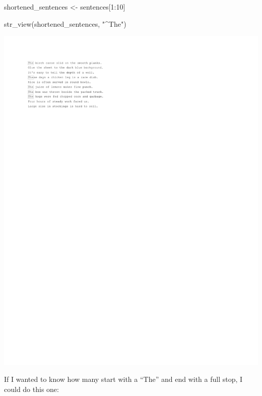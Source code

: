 \documentclass[
]{book}
\newenvironment{Shaded}{\begin{snugshade}}{\end{snugshade}}
\newcommand{\DecValTok}[1]{\textcolor[rgb]{0.00,0.00,0.81}{#1}}
\newcommand{\FunctionTok}[1]{\textcolor[rgb]{0.00,0.00,0.00}{#1}}
\newcommand{\NormalTok}[1]{#1}
\newcommand{\OtherTok}[1]{\textcolor[rgb]{0.56,0.35,0.01}{#1}}
\newcommand{\SpecialCharTok}[1]{\textcolor[rgb]{0.00,0.00,0.00}{#1}}
\newcommand{\StringTok}[1]{\textcolor[rgb]{0.31,0.60,0.02}{#1}}
\begin{document}
\begin{Shaded}
\begin{Highlighting}[]
\NormalTok{shortened\_sentences }\OtherTok{\textless{}{-}}\NormalTok{ sentences[}\DecValTok{1}\SpecialCharTok{:}\DecValTok{10}\NormalTok{]}

\FunctionTok{str\_view}\NormalTok{(shortened\_sentences, }\StringTok{"\^{}The"}\NormalTok{) }
\end{Highlighting}
\end{Shaded}

\includegraphics{_main_files/figure-latex/unnamed-chunk-34-1.pdf}

If I wanted to know how many start with a ``The'' and end with a full stop, I could do this one:

\begin{Shaded}
\end{Shaded}
\end{document}
